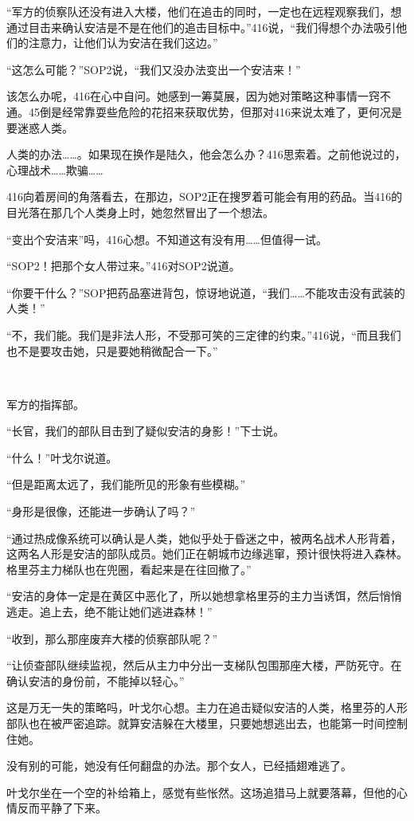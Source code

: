 “军方的侦察队还没有进入大楼，他们在追击的同时，一定也在远程观察我们，想通过目击来确认安洁是不是在他们的追击目标中。”416说，“我们得想个办法吸引他们的注意力，让他们认为安洁在我们这边。”

“这怎么可能？”SOP2说，“我们又没办法变出一个安洁来！”

该怎么办呢，416在心中自问。她感到一筹莫展，因为她对策略这种事情一窍不通。45倒是经常靠耍些危险的花招来获取优势，但那对416来说太难了，更何况是要迷惑人类。

人类的办法……。如果现在换作是陆久，他会怎么办？416思索着。之前他说过的，心理战术……欺骗……

416向着房间的角落看去，在那边，SOP2正在搜罗着可能会有用的药品。当416的目光落在那几个人类身上时，她忽然冒出了一个想法。

“变出个安洁来”吗，416心想。不知道这有没有用……但值得一试。

“SOP2！把那个女人带过来。”416对SOP2说道。

“你要干什么？”SOP把药品塞进背包，惊讶地说道，“我们……不能攻击没有武装的人类！”

“不，我们能。我们是非法人形，不受那可笑的三定律的约束。”416说，“而且我们也不是要攻击她，只是要她稍微配合一下。”

 

军方的指挥部。

“长官，我们的部队目击到了疑似安洁的身影！”下士说。

“什么！”叶戈尔说道。

“但是距离太远了，我们能所见的形象有些模糊。”

“身形是很像，还能进一步确认了吗？”

“通过热成像系统可以确认是人类，她似乎处于昏迷之中，被两名战术人形背着，这两名人形是安洁的部队成员。她们正在朝城市边缘逃窜，预计很快将进入森林。格里芬主力梯队也在兜圈，看起来是在往回撤了。”

“安洁的身体一定是在黄区中恶化了，所以她想拿格里芬的主力当诱饵，然后悄悄逃走。追上去，绝不能让她们逃进森林！”

“收到，那么那座废弃大楼的侦察部队呢？”

“让侦查部队继续监视，然后从主力中分出一支梯队包围那座大楼，严防死守。在确认安洁的身份前，不能掉以轻心。”

这是万无一失的策略吗，叶戈尔心想。主力在追击疑似安洁的人类，格里芬的人形部队也在被严密追踪。就算安洁躲在大楼里，只要她想逃出去，也能第一时间控制住她。

没有别的可能，她没有任何翻盘的办法。那个女人，已经插翅难逃了。

叶戈尔坐在一个空的补给箱上，感觉有些怅然。这场追猎马上就要落幕，但他的心情反而平静了下来。


